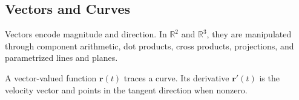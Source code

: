 \subsection*{Vectors and Curves}

\begin{definition*}
Vectors encode magnitude and direction. In \(\mathbb{R}^2\) and
\(\mathbb{R}^3\), they are manipulated through component arithmetic, dot
products, cross products, projections, and parametrized lines and planes.
\end{definition*}

\begin{definition*}
A vector-valued function \(\mathbf r(t)\) traces a curve. Its derivative
\(\mathbf r'(t)\) is the velocity vector and points in the tangent direction
when nonzero.
\end{definition*}

